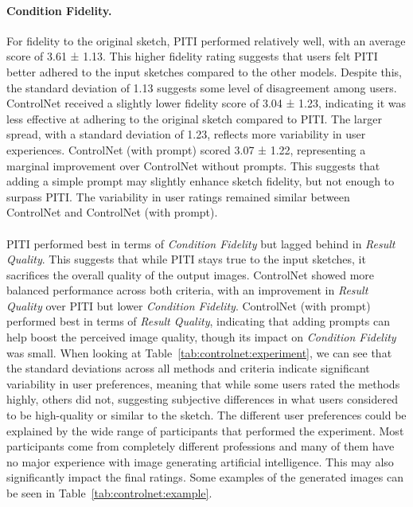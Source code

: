\paragraph{Condition Fidelity.}
For fidelity to the original sketch, PITI performed relatively well, with an average score of 3.61 ± 1.13. This higher fidelity rating suggests that users felt PITI better adhered to the input sketches compared to the other models. Despite this, the standard deviation of 1.13 suggests some level of disagreement among users. ControlNet received a slightly lower fidelity score of 3.04 ± 1.23, indicating it was less effective at adhering to the original sketch compared to PITI. The larger spread, with a standard deviation of 1.23, reflects more variability in user experiences. ControlNet (with prompt) scored 3.07 ± 1.22, representing a marginal improvement over ControlNet without prompts. This suggests that adding a simple prompt may slightly enhance sketch fidelity, but not enough to surpass PITI. The variability in user ratings remained similar between ControlNet and ControlNet (with prompt).
\\
\\
\noindent
PITI performed best in terms of \textit{Condition Fidelity} but lagged behind in \textit{Result Quality}. This suggests that while PITI stays true to the input sketches, it sacrifices the overall quality of the output images. ControlNet showed more balanced performance across both criteria, with an improvement in \textit{Result Quality} over PITI but lower \textit{Condition Fidelity}. ControlNet (with prompt) performed best in terms of \textit{Result Quality}, indicating that adding prompts can help boost the perceived image quality, though its impact on \textit{Condition Fidelity} was small. When looking at Table~\ref{tab:controlnet:experiment}, we can see that the standard deviations across all methods and criteria indicate significant variability in user preferences, meaning that while some users rated the methods highly, others did not, suggesting subjective differences in what users considered to be high-quality or similar to the sketch. The different user preferences could be explained by the wide range of participants that performed the experiment. Most participants come from completely different professions and many of them have no major experience with image generating artificial intelligence. This may also significantly impact the final ratings. Some examples of the generated images can be seen in Table~\ref{tab:controlnet:example}.
